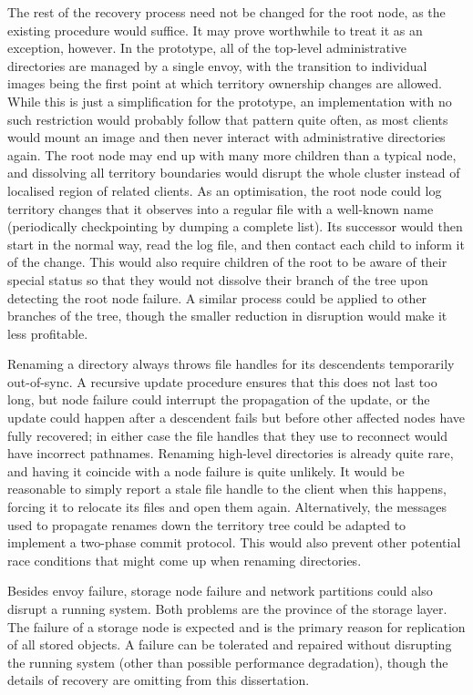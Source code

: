 The rest of the recovery process need not be changed for the root node, as the existing procedure would suffice. It may prove worthwhile to treat it as an exception, however. In the prototype, all of the top-level administrative directories are managed by a single envoy, with the transition to individual images being the first point at which territory ownership changes are allowed. While this is just a simplification for the prototype, an implementation with no such restriction would probably follow that pattern quite often, as most clients would mount an image and then never interact with administrative directories again. The root node may end up with many more children than a typical node, and dissolving all territory boundaries would disrupt the whole cluster instead of localised region of related clients. As an optimisation, the root node could log territory changes that it observes into a regular file with a well-known name (periodically checkpointing by dumping a complete list). Its successor would then start in the normal way, read the log file, and then contact each child to inform it of the change. This would also require children of the root to be aware of their special status so that they would not dissolve their branch of the tree upon detecting the root node failure. A similar process could be applied to other branches of the tree, though the smaller reduction in disruption would make it less profitable.

Renaming a directory always throws file handles for its descendents temporarily out-of-sync. A recursive update procedure ensures that this does not last too long, but node failure could interrupt the propagation of the update, or the update could happen after a descendent fails but before other affected nodes have fully recovered; in either case the file handles that they use to reconnect would have incorrect pathnames. Renaming high-level directories is already quite rare, and having it coincide with a node failure is quite unlikely. It would be reasonable to simply report a stale file handle to the client when this happens, forcing it to relocate its files and open them again. Alternatively, the messages used to propagate renames down the territory tree could be adapted to implement a two-phase commit protocol. This would also prevent other potential race conditions that might come up when renaming directories.


Besides envoy failure, storage node failure and network partitions could also disrupt a running system. Both problems are the province of the storage layer. The failure of a storage node is expected and is the primary reason for replication of all stored objects. A failure can be tolerated and repaired without disrupting the running system (other than possible performance degradation), though the details of recovery are omitting from this dissertation.

